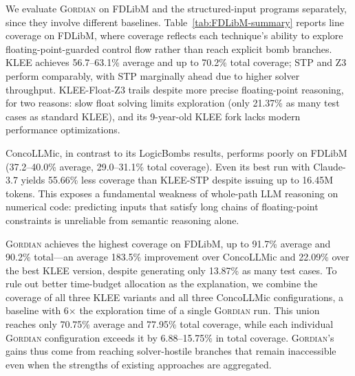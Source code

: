 \documentclass[acmsmall,screen,nonacm]{acmart}
\newcommand{\projName}{\textsc{Gordian}\xspace}
\theoremstyle{definition}
\begin{document}
We evaluate \projName{} on FDLibM and the structured-input programs separately, since they involve different baselines.
Table~\ref{tab:FDLibM-summary} reports line coverage on FDLibM, where coverage reflects each technique's ability to explore floating-point-guarded control flow rather than reach explicit bomb branches. KLEE achieves 56.7--63.1\% average and up to 70.2\% total coverage; STP and Z3 perform comparably, with STP marginally ahead due to higher solver throughput. KLEE-Float-Z3 trails despite more precise floating-point reasoning, for two reasons: slow float solving limits exploration (only 21.37\% as many test cases as standard KLEE), and its 9-year-old KLEE fork lacks modern performance optimizations.

ConcoLLMic, in contrast to its LogicBombs results, performs poorly on FDLibM (37.2--40.0\% average, 29.0--31.1\% total coverage). Even its best run with Claude-3.7 yields 55.66\% less coverage than KLEE-STP despite issuing up to 16.45M tokens. This exposes a fundamental weakness of whole-path LLM reasoning on numerical code: predicting inputs that satisfy long chains of floating-point constraints is unreliable from semantic reasoning alone.

\projName{} achieves the highest coverage on FDLibM, up to 91.7\% average and 90.2\% total---an average 183.5\% improvement over ConcoLLMic and 22.09\% over the best KLEE version, despite generating only 13.87\% as many test cases. To rule out better time-budget allocation as the explanation, we combine the coverage of all three KLEE variants and all three ConcoLLMic configurations, a baseline with 6$\times$ the exploration time of a single \projName{} run. This union reaches only 70.75\% average and 77.95\% total coverage, while each individual \projName{} configuration exceeds it by 6.88--15.75\% in total coverage. \projName{}'s gains thus come from reaching solver-hostile branches that remain inaccessible even when the strengths of existing approaches are aggregated.

\end{document}
